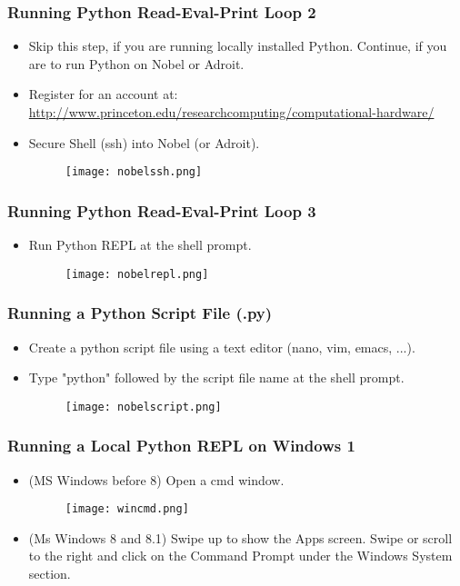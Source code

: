 \documentclass{beamer}
\begin{document}
\begin{frame}[fragile]
\frametitle{Running Python Read-Eval-Print Loop 2}
\begin{itemize}
\item Skip this step, if you are running locally installed Python.
Continue, if you are to run Python on Nobel or Adroit.
\item Register for an account at:
\url{http://www.princeton.edu/researchcomputing/computational-hardware/}
\item Secure Shell (ssh) into Nobel (or Adroit).
\begin{figure}[h]
    \texttt{[image: nobelssh.png]}
\end{figure}
\end{itemize}
\end{frame}

\begin{frame}[fragile]
\frametitle{Running Python Read-Eval-Print Loop 3}
\begin{itemize}
\item Run Python REPL at the shell prompt.
\begin{figure}[h]
    \texttt{[image: nobelrepl.png]}
\end{figure}
\end{itemize}
\end{frame}

\begin{frame}[fragile]
\frametitle{Running a Python Script File (.py)}
\begin{itemize}
\item Create a python script file using a text editor
    (nano, vim, emacs, ...).
\item Type "python" followed by the script file name 
    at the shell prompt.
\begin{figure}[h]
\texttt{[image: nobelscript.png]}
\end{figure}
\end{itemize}
\end{frame}

\begin{frame}[fragile]
\frametitle{Running a Local Python REPL on Windows 1}
\begin{itemize}
\item (MS Windows before 8) Open a cmd window.
\begin{figure}[h]
    \texttt{[image: wincmd.png]}
\end{figure}
\item (Ms Windows 8 and 8.1) Swipe up to show the Apps
     screen. Swipe or scroll to the right and click
     on the Command Prompt under the Windows System
     section.
\end{itemize}
\end{frame}
\end{document}
